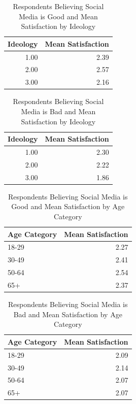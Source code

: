 \documentclass[
]{article}
\begin{document}
\begin{table}[ht]
\centering
\caption{Respondents Believing Social Media is Good
             and Mean Satisfaction by Ideology} 
\begin{tabular}{rr}
  \hline
Ideology & Mean Satisfaction \\ 
  \hline
1.00 & 2.39 \\ 
  2.00 & 2.57 \\ 
  3.00 & 2.16 \\ 
   \hline
\end{tabular}
\end{table}
\begin{table}[ht]
\centering
\caption{Respondents Believing Social Media is Bad
             and Mean Satisfaction by Ideology} 
\begin{tabular}{rr}
  \hline
Ideology & Mean Satisfaction \\ 
  \hline
1.00 & 2.30 \\ 
  2.00 & 2.22 \\ 
  3.00 & 1.86 \\ 
   \hline
\end{tabular}
\end{table}
\begin{table}[ht]
\centering
\caption{Respondents Believing Social Media is Good
             and Mean Satisfaction by Age Category} 
\begin{tabular}{lr}
  \hline
Age Category & Mean Satisfaction \\ 
  \hline
18-29 & 2.27 \\ 
  30-49 & 2.41 \\ 
  50-64 & 2.54 \\ 
  65+ & 2.37 \\ 
   \hline
\end{tabular}
\end{table}
\begin{table}[ht]
\centering
\caption{Respondents Believing Social Media is Bad
             and Mean Satisfaction by Age Category} 
\begin{tabular}{lr}
  \hline
Age Category & Mean Satisfaction \\ 
  \hline
18-29 & 2.09 \\ 
  30-49 & 2.14 \\ 
  50-64 & 2.07 \\ 
  65+ & 2.07 \\ 
   \hline
\end{tabular}
\end{table}
\end{document}
